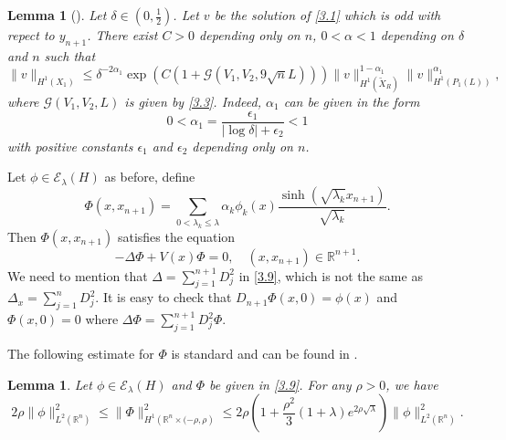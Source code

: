 \documentclass{article}
\numberwithin{equation}{section}
\newcommand\R{\ensuremath{\mathbb{R}}}
\newtheorem{lemma}[theorem]{Lemma}
\numberwithin{equation}{section}
\theoremstyle{definition}
\begin{document}
\begin{lemma}[{\cite[Lemma~2]{zhu2023spectral}}]\label{lma3.2}
	Let $\delta \in (0,\frac{1}{2})$. Let $v$ be the solution of \eqref{3.1} which is odd with repect to $y_{n+1}$. There exist $C>0$ depending only on $n$, $0<\alpha <1$ depending on $\delta$ and $n$ such that
	\begin{equation}\label{3.5}
		\|v\|_{H^{1}(X_1)}\le \delta^{-2\alpha _1}\exp\left( C\left( 1+\mathcal{G}\left( V_1,V_2,9\sqrt{n} L \right)  \right)  \right) \|v\|^{1-\alpha _1}_{H^{1}\left( \widetilde{X}_{R} \right) }\|v\|^{\alpha_1}_{H^{1}\left( P_1(L) \right) },
	\end{equation}
	where $\mathcal{G}(V_1,V_2,L)$ is given by \eqref{3.3}. Indeed, $\alpha_1$ can be given in the form
\begin{equation}\label{3.7}
	0<\alpha_1= \frac{\epsilon_1}{|\log \delta|+\epsilon_2}<1
\end{equation}
with positive constants $\epsilon_1$ and $\epsilon_2$ depending only on  $n$.
\end{lemma}
Let $\phi \in \mathcal{E}_\lambda(H)$ as before, define
\begin{equation}\label{3.8}
	\Phi(x,x_{n+1})=\sum_{0<\lambda_k\le \lambda} \alpha_k \phi_k(x) \frac{\sinh (\sqrt{\lambda_k} x_{n+1})}{\sqrt{\lambda_k} }.
\end{equation}
Then $\Phi(x,x_{n+1})$ satisfies the equation 
\begin{equation}\label{3.9}
	-\Delta \Phi+V(x)\Phi=0,\quad (x,x_{n+1}) \in \R^{n+1}.
\end{equation}
We need to mention that $\Delta=\sum_{j=1}^{n+1} D^2_{j}$ in \eqref{3.9}, which is not the same as $\Delta_x=\sum_{j=1}^{n} D^2_{j}$.
It is easy to check that $D_{n+1}\Phi(x,0)=\phi(x)$ and $\Phi(x,0)=0$ where $\Delta \Phi=\sum_{j=1}^{n+1} D_j^2\Phi$.

The following estimate for $\Phi$ is standard and can be found in \cite[Lemma~3]{zhu2023spectral}.
\begin{lemma}\label{lma3.3}
	Let $\phi \in  \mathcal{E}_\lambda(H)$ and $\Phi$ be given in \eqref{3.9}. For any $\rho >0$, we have
	\begin{equation}
		2\rho \|\phi\|^2_{L^2(\R^{n})}\le \|\Phi\|^2_{H^{1}\left( \R^{n}\times (-\rho,\rho \right) }\le 2\rho \left( 1+ \frac{\rho^2}{3}(1+\lambda)e^{2\rho \sqrt{\lambda} } \right) \|\phi\|^2_{L^2(\R^{n})}.
	\end{equation}
\end{lemma}
\end{document}
